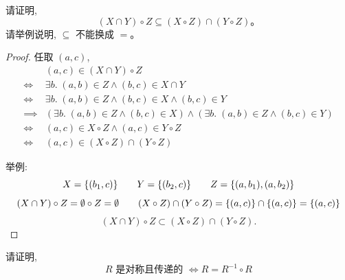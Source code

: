 \documentclass[a4paper, justified]{tufte-handout}
\begin{document}
\newpage
\begin{problem}[关系的运算]
  请证明,
  \[
    (X \cap Y) \circ Z \subseteq (X \circ Z) \cap (Y \circ Z)\text{。}
  \]
  请举例说明, $\subseteq$ 不能换成 $=$。
\end{problem}

\begin{proof}
  任取 $(a, c)$,
  \setcounter{equation}{0}
  \begin{align*}
    & (a, c) \in (X \cap Y) \circ Z \\[6pt]
    \iff & \exists b.\; (a, b) \in Z \land (b, c) \in X \cap Y \\[6pt]
    \iff & \exists b.\; (a, b) \in Z \land (b, c) \in X \land (b, c) \in Y \\[6pt]
    \implies & (\exists b.\; (a, b) \in Z \land (b, c) \in X)
      \land (\exists b.\; (a, b) \in Z \land (b, c) \in Y) \\[6pt]
    \iff & (a, c) \in X \circ Z \land (a, c) \in Y \circ Z \\[6pt]
    \iff & (a, c) \in (X \circ Z) \cap (Y \circ Z)
  \end{align*}

  举例:
  \[
    X = \{(b_{1}, c)\}
    \qquad Y = \{(b_{2}, c)\}
    \qquad Z = \{(a, b_{1}), (a, b_{2})\}
  \]
  \[
    (X \cap Y) \circ Z = \emptyset \circ Z = \emptyset
    \qquad (X \circ Z) \cap (Y \circ Z) = \{(a, c)\} \cap \{(a, c)\} = \{(a, c)\}
  \]
  \[
    (X \cap Y) \circ Z \subset (X \circ Z) \cap (Y \circ Z).
  \]
\end{proof}

\newpage
\begin{problem}[关系的性质]
  请证明,
  \[
    R \text{ 是对称且传递的 } \iff R = R^{-1} \circ R
  \]
\end{problem}
\end{document}
